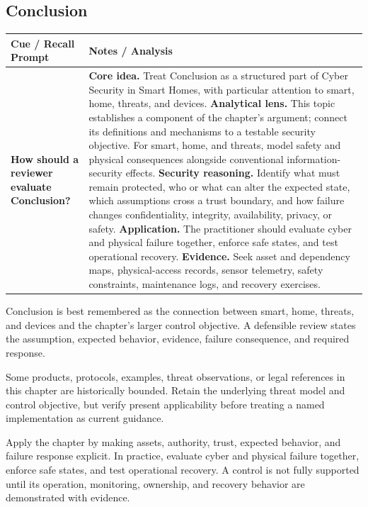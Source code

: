 \documentclass[11pt]{article}
\newcommand{\CornellHeader}{%
\rowcolor{Navy}\color{white}\bfseries Cue / Recall Prompt & \color{white}\bfseries Notes / Analysis\\\hline}
\newcommand{\CornellRow}[2]{%
\cellcolor{CueGray}\RaggedRight\textbf{#1} & \RaggedRight #2\\\hline}
\begin{document}
\subsection*{Conclusion}
\begin{longtable}{>{\RaggedRight\arraybackslash}p{}|>{\RaggedRight\arraybackslash}p{}}
\CornellHeader
\CornellRow{How should a reviewer evaluate Conclusion?}{\textbf{Core idea.} Treat Conclusion as a structured part of Cyber Security in Smart Homes, with particular attention to smart, home, threats, and devices. \textbf{Analytical lens.} This topic establishes a component of the chapter's argument; connect its definitions and mechanisms to a testable security objective. For smart, home, and threats, model safety and physical consequences alongside conventional information-security effects. \textbf{Security reasoning.} Identify what must remain protected, who or what can alter the expected state, which assumptions cross a trust boundary, and how failure changes confidentiality, integrity, availability, privacy, or safety. \textbf{Application.} The practitioner should evaluate cyber and physical failure together, enforce safe states, and test operational recovery. \textbf{Evidence.} Seek asset and dependency maps, physical-access records, sensor telemetry, safety constraints, maintenance logs, and recovery exercises.}
\end{longtable}
\begin{topicsummary}
Conclusion is best remembered as the connection between smart, home, threats, and devices and the chapter's larger control objective. A defensible review states the assumption, expected behavior, evidence, failure consequence, and required response.
\end{topicsummary}
\begin{historybox}
Some products, protocols, examples, threat observations, or legal references in this chapter are historically bounded. Retain the underlying threat model and control objective, but verify present applicability before treating a named implementation as current guidance.
\end{historybox}
\begin{defensebox}
Apply the chapter by making assets, authority, trust, expected behavior, and failure response explicit. In practice, evaluate cyber and physical failure together, enforce safe states, and test operational recovery. A control is not fully supported until its operation, monitoring, ownership, and recovery behavior are demonstrated with evidence.
\end{defensebox}
\end{document}

